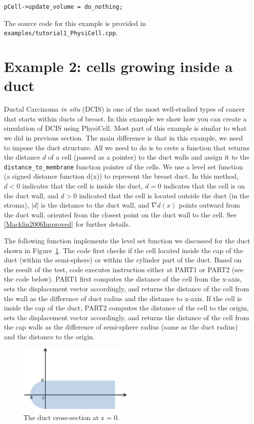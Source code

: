 \documentclass[11pt]{article}
\begin{document}
\begin{verbatim}
pCell->update_volume = do_nothing;
\end{verbatim}

The source code for this example is provided in \verb:examples/tutorial1_PhysiCell.cpp:.


\section{Example 2: cells growing inside a duct}

Ductal Carcinoma \textit{in situ} (DCIS) is one of the most well-studied types of cancer that starts within ducts of breast. In this
example we show how you can create a simulation of DCIS using PhysiCell. Most part of this example is similar to what we did in previous section. 
The main difference is that in this example, we need to impose the duct structure. All we need to do is to crete a function that returns the distance $d$
of a cell (passed as a pointer) to the duct walls and assign it to the \verb:distance_to_membrane: function pointer of the cells. We use a level set function (a signed distance function d(x)) to represent the breast duct. In this method, $d < 0$ indicates that the cell is inside the duct, $d = 0$ indicates that the cell is on the duct wall, and $d > 0$ indicated that the cell is located outside the duct (in the stroma), $|d|$ is the distance to the duct wall, and $\nabla d(x)$ points outward from the duct wall, oriented from the closest point on the duct wall to the cell. See \ref{Macklin2006Improved} for further details.

The following function implements the level set function we discussed for the duct shown in Figure~\ref{fig:duct_structure}. The code first checks if the cell located inside the cap of the duct (within the semi-sphere) or within the cylinder part of the duct. Based on the result of the test, code executes instruction either at PART1 or PART2 (see the code below). PART1 first computes the distance of the cell from the x-axis, sets the displacement vector accordingly, and returns the distance of the cell from the wall as the difference of duct radius and the distance to x-axis. If the cell is inside the cap of the duct, PART2 computes the distance of the cell to the origin, sets the displacement vector accordingly, and returns the distance of the cell from the cap walls as the difference of semi-sphere radius (same as the duct radius) and the distance to the origin.

\begin{figure}[h]
\centering
\includegraphics[width=0.5\textwidth]{duct_structure.png} 
\caption{ The duct cross-section at z = 0.  }
\label{fig:duct_structure}
\end{figure}
\end{document}
